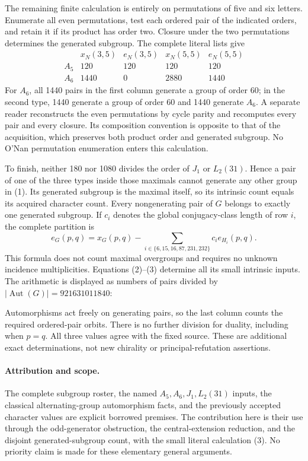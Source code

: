 \documentclass[11pt,a4paper]{article}
\newcommand{\Aut}{\operatorname{Aut}}\newcommand{\Out}{\operatorname{Out}}
\begin{document}
The remaining finite calculation is entirely on permutations of
five and six letters. Enumerate all even permutations, test each
ordered pair of the indicated orders, and retain it if its product
has order two. Closure under the two permutations determines the
generated subgroup. The complete literal lists give
\[
\begin{array}{c|rr|rr}
 &x_N(3,5)&e_N(3,5)&x_N(5,5)&e_N(5,5)\\\hline
 A_5&120&120&120&120\\
 A_6&1440&0&2880&1440
\end{array}                                                   \tag{3}
\]
For $A_6$, all 1440 pairs in the first column generate a group of
order 60; in the second type, 1440 generate a group of order 60
and 1440 generate $A_6$. A separate reader reconstructs the even
permutations by cycle parity and recomputes every pair and every
closure. Its composition convention is opposite to that of the
acquisition, which preserves both product order and generated subgroup.
No O'Nan permutation enumeration enters this calculation.

To finish, neither 180 nor 1080 divides the order of $J_1$ or
$L_2(31)$. Hence a pair of one of the three types inside those
maximals cannot generate any other group in (1). Its generated
subgroup is the maximal itself, so its intrinsic count equals its
acquired character count. Every nongenerating pair of $G$ belongs
to exactly one generated subgroup. If $c_i$ denotes the global
conjugacy-class length of row $i$, the complete partition is
\[
 e_G(p,q)=x_G(p,q)-\sum_{i\in\{6,15,16,87,231,232\}}
                         c_i e_{H_i}(p,q).                    \tag{4}
\]
This formula does not count maximal overgroups and requires no
unknown incidence multiplicities. Equations (2)--(3) determine all
its small intrinsic inputs. The arithmetic is displayed as numbers
of pairs divided by $|\Aut(G)|=921631011840$:

Automorphisms act freely on generating pairs, so the last column
counts the required ordered-pair orbits. There is no further
division for duality, including when $p=q$. All three values agree
with the fixed source. These are additional exact determinations,
not new chirality or principal-refutation assertions.

\paragraph{Attribution and scope.}
The complete subgroup roster, the named $A_5,A_6,J_1,L_2(31)$
inputs, the classical alternating-group automorphism facts, and
the previously accepted character values are explicit borrowed
premises. The contribution here is their use through the odd-generator
obstruction, the central-extension reduction, and the disjoint
generated-subgroup count, with the small literal calculation (3).
No priority claim is made for these elementary general arguments.
\end{document}

